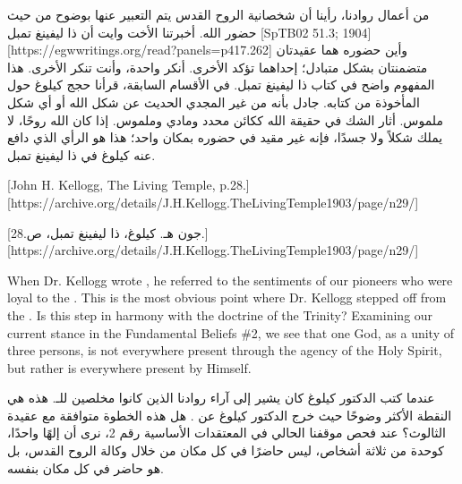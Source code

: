 من أعمال روادنا، رأينا أن شخصانية الروح القدس يتم التعبير عنها بوضوح من حيث حضور الله. أخبرتنا الأخت وايت أن ذا ليفينغ تمبل [SpTB02 51.3; 1904][https://egwwritings.org/read?panels=p417.262]  وأين حضوره هما عقيدتان متضمنتان بشكل متبادل؛ إحداهما تؤكد الأخرى. أنكر واحدة، وأنت تنكر الأخرى. هذا المفهوم واضح في كتاب ذا ليفينغ تمبل. في الأقسام السابقة، قرأنا حجج كيلوغ حول  المأخوذة من كتابه. جادل بأنه من غير المجدي الحديث عن شكل الله أو أي شكل ملموس. أثار الشك في حقيقة الله ككائن محدد ومادي وملموس. إذا كان الله روحًا، لا يملك شكلاً ولا جسدًا، فإنه غير مقيد في حضوره بمكان واحد؛ هذا هو الرأي الذي دافع عنه كيلوغ في ذا ليفينغ تمبل.


[John H. Kellogg, The Living Temple, p.28.][https://archive.org/details/J.H.Kellogg.TheLivingTemple1903/page/n29/]


[جون هـ. كيلوغ، ذا ليفينغ تمبل، ص.28.][https://archive.org/details/J.H.Kellogg.TheLivingTemple1903/page/n29/]


When Dr. Kellogg wrote , he referred to the sentiments of our pioneers who were loyal to the . This is the most obvious point where Dr. Kellogg stepped off from the . Is this step in harmony with the doctrine of the Trinity? Examining our current stance in the Fundamental Beliefs \#2, we see that one God, as a unity of three persons, is not everywhere present through the agency of the Holy Spirit, but rather is everywhere present by Himself.


عندما كتب الدكتور كيلوغ  كان يشير إلى آراء روادنا الذين كانوا مخلصين للـ. هذه هي النقطة الأكثر وضوحًا حيث خرج الدكتور كيلوغ عن . هل هذه الخطوة متوافقة مع عقيدة الثالوث؟ عند فحص موقفنا الحالي في المعتقدات الأساسية رقم 2، نرى أن إلهًا واحدًا، كوحدة من ثلاثة أشخاص، ليس حاضرًا في كل مكان من خلال وكالة الروح القدس، بل هو حاضر في كل مكان بنفسه.


